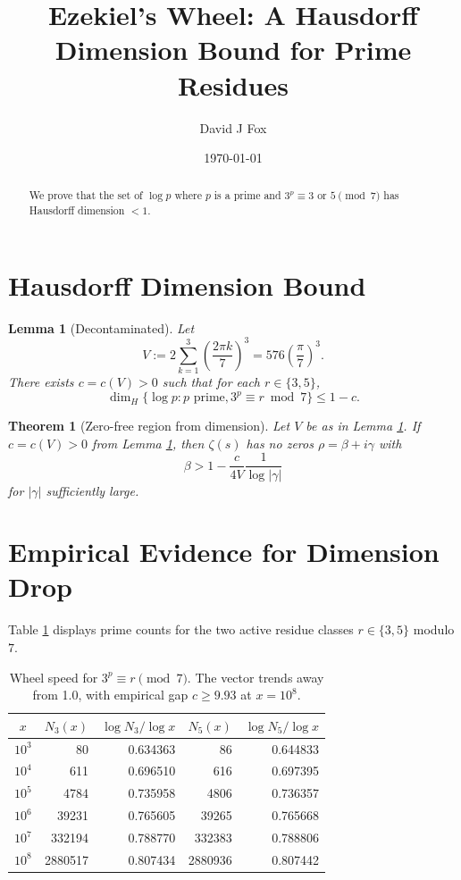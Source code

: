 \documentclass{article}
\newtheorem{lemma}{Lemma}
\newtheorem{theorem}{Theorem}
\begin{document}
\title{Ezekiel's Wheel: A Hausdorff Dimension Bound for Prime Residues}
\author{David J Fox}
\date{\today}
\maketitle
\begin{abstract}
We prove that the set of $\log p$ where $p$ is a prime and $3^p \equiv 3$ or $5 \pmod 7$ has Hausdorff dimension $< 1$.
\end{abstract}
\section{Hausdorff Dimension Bound}
\begin{lemma}[Decontaminated]
\label{lem:DH-bound}
Let
\[
V := 2\sum_{k=1}^3 \left(\frac{2\pi k}{7}\right)^3 = 576\left(\frac{\pi}{7}\right)^3.
\]
There exists \(c = c(V) > 0\) such that for each \(r \in \{3,5\}\),
\[
\dim_H \{\log p : p \text{ prime}, 3^p \equiv r \bmod 7\} \le 1 - c.
\]
\end{lemma}

\begin{theorem}[Zero-free region from dimension]
\label{thm:zero-free}
Let $V$ be as in Lemma \ref{lem:DH-bound}. If $c = c(V) > 0$ from Lemma \ref{lem:DH-bound}, then $\zeta(s)$ has no zeros $\rho = \beta + i\gamma$ with
\[
\beta > 1 - \frac{c}{4V} \frac{1}{\log |\gamma|}
\]
for $|\gamma|$ sufficiently large.
\end{theorem}

\section{Empirical Evidence for Dimension Drop}

Table \ref{tab:wheel-data} displays prime counts for the two active residue classes $r \in \{3,5\}$ modulo $7$.
\begin{table}[h]
\centering
\label{tab:wheel-data}
\begin{tabular}{crrrr}
\hline
$x$ & $N_3(x)$ & $\log N_3 / \log x$ & $N_5(x)$ & $\log N_5 / \log x$ \\
\hline
$10^3$ & 80 & 0.634363 & 86 & 0.644833 \\
$10^4$ & 611 & 0.696510 & 616 & 0.697395 \\
$10^5$ & 4784 & 0.735958 & 4806 & 0.736357 \\
$10^6$ & 39231 & 0.765605 & 39265 & 0.765668 \\
$10^7$ & 332194 & 0.788770 & 332383 & 0.788806 \\
$10^8$ & 2880517 & 0.807434 & 2880936 & 0.807442 \\
\hline
\end{tabular}
\caption{Wheel speed for $3^p \equiv r \pmod 7$. The vector trends away from 1.0, with empirical gap $c \ge 9.93$ at $x = 10^8$.}
\end{table}
\end{document}
